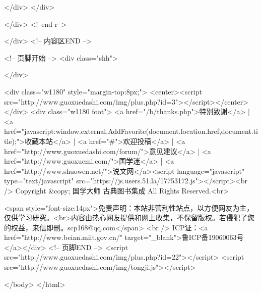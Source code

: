 </div> 
</div>

</div>  <!--end r-->

</div>
<!-- 内容区END --> 

<!-- 页脚开始 -->
<div class="shh">

</div>

<div class="w1180" style="margin-top:8px;">
<center><script src="http://www.guoxuedashi.com/img/plus.php?id=3"></script></center>
</div>
<div class="w1180 foot">
<a href="/b/thanks.php">特别致谢</a> | <a href="javascript:window.external.AddFavorite(document.location.href,document.title);">收藏本站</a> | <a href="#">欢迎投稿</a> | <a href="http://www.guoxuedashi.com/forum/">意见建议</a> | <a href="http://www.guoxuemi.com/">国学迷</a> | <a href="http://www.shuowen.net/">说文网</a><script language="javascript" type="text/javascript" src="https://js.users.51.la/17753172.js"></script><br />
  Copyright &copy; 国学大师 古典图书集成 All Rights Reserved.<br>
  
  <span style="font-size:14px">免责声明：本站非营利性站点，以方便网友为主，仅供学习研究。<br>内容由热心网友提供和网上收集，不保留版权。若侵犯了您的权益，来信即刪。scp168@qq.com</span>
  <br />
ICP证：<a href="http://www.beian.miit.gov.cn/" target="_blank">鲁ICP备19060063号</a></div>
<!-- 页脚END --> 
<script src="http://www.guoxuedashi.com/img/plus.php?id=22"></script>
<script src="http://www.guoxuedashi.com/img/tongji.js"></script>

</body>
</html>
